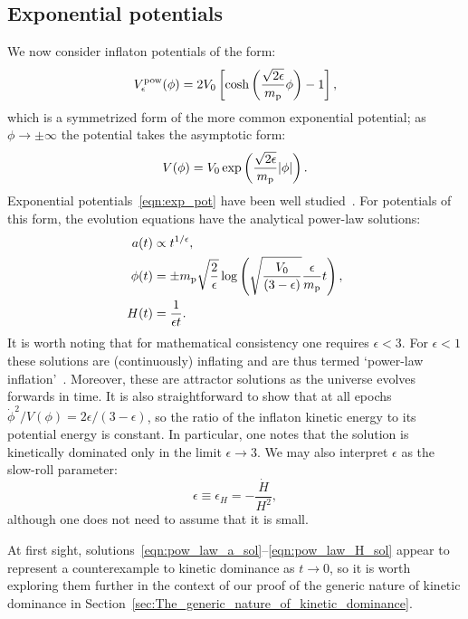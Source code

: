 \subsection{Exponential potentials}
\label{sec:Exponential_potentials}
We now consider inflaton potentials of the form:
%
\begin{equation}
  V^\mathrm{pow}_\epsilon(\phi) 
  = 
  2V_0\left[
  \cosh\left(\frac{\sqrt{2\epsilon}}{m_{\mathrm{p}}}\phi\right)-1
  \right],
  \label{eqn:coshpot}
\end{equation}
%
which is a symmetrized form of the more common exponential potential; as \(\phi\rightarrow\pm\infty\) the potential takes the asymptotic form:
%
\begin{equation}
  V(\phi) 
  = 
  V_0 \exp\left(\frac{\sqrt{2\epsilon}}{m_{\mathrm{p}}} |\phi|\right).
  \label{eqn:exp_pot}
\end{equation}
%
Exponential potentials~\eqref{eqn:exp_pot} have been well studied~\citep{yokoyama_dynamics_1988}. For potentials of this form, the evolution equations have the analytical power-law solutions:
%
\begin{align}
  a(t) 
  &\propto 
  {t}^{1/\epsilon},
  \label{eqn:pow_law_a_sol}
  \\
  \phi(t)
  &=
  \pm m_{\mathrm{p}}\sqrt{\frac{2}{\epsilon}}
  \log\left(\sqrt{\frac{V_0}{\left(3-\epsilon\right)}}
  \frac{\epsilon}{m_{\mathrm{p}}} t\right),
  \\
  H(t)
  &=
  \frac{1}{\epsilon t}.  
  \label{eqn:pow_law_H_sol}
\end{align}
%
It is worth noting that for mathematical consistency one requires \(\epsilon < 3\). For \(\epsilon<1\) these solutions are (continuously) inflating and are thus termed `power-law inflation'~\citep{lucchin_power-law_1985}. Moreover, these are attractor solutions as the universe evolves forwards in time. It is also straightforward to show that at all epochs \(\dot{\phi}^2/V(\phi) = 2\epsilon/(3-\epsilon)\), so the ratio of the inflaton kinetic energy to its potential energy is constant. In particular, one notes that the solution is kinetically dominated only in the limit \(\epsilon \to 3\).  We may also interpret \(\epsilon\) as the slow-roll parameter:
%
\begin{equation}
  \epsilon\equiv\epsilon_H = -\frac{\dot{H}}{H^2},
\end{equation}
%
although one does not need to assume that it is small.

At first sight, solutions~\eqref{eqn:pow_law_a_sol}--\eqref{eqn:pow_law_H_sol} appear to represent a counterexample to kinetic dominance as \(t \to 0\), so it is worth exploring them further in the context of our proof of the generic nature of kinetic dominance in Section~\ref{sec:The_generic_nature_of_kinetic_dominance}. 


